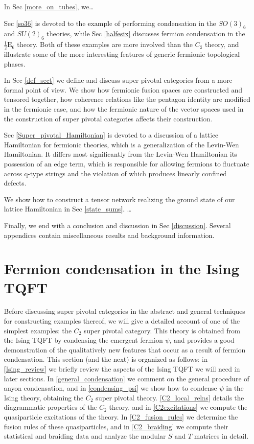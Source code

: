 \documentclass[12pt,a4paper]{article}
\newcommand{\halfesix}{\frac{1}{2}\text{E}_6}
\begin{document}
In Sec \ref{more_on_tubes}, we\dots 


Sec \ref{so36} is devoted to the example of performing condensation in the $SO(3)_6$ 
and $SU(2)_6$ theories, while Sec \ref{halfesix} discusses fermion condensation in the $
\halfesix$ theory. 
Both of these examples are more involved than the $C_2$ theory, 
and illustrate some of the more interesting features of generic fermionic topological phases. 

In Sec \ref{def_sect} we define and discuss super pivotal categories from a more formal point of view. 
We show how fermionic fusion spaces are constructed and tensored together, how 
coherence relations like the pentagon identity are modified in the fermionic case, 
and how the fermionic nature of the vector spaces used in the construction of super 
pivotal categories affects their construction. 

Sec \ref{Super_pivotal_Hamiltonian} is devoted to a discussion of a lattice Hamiltonian for fermionic theories, which is a generalization of the Levin-Wen Hamiltonian. 
It differs most significantly from the Levin-Wen Hamiltonian its possession of an edge term, which 
is responsible for allowing fermions to fluctuate across q-type strings and the violation 
of which produces linearly confined defects. 

We show how to construct a tensor network realizing the ground state of our lattice Hamiltonian 
in Sec \ref{state_sums}. \dots


Finally, we end with a conclusion and discussion in Sec \ref{discussion}. 
Several appendices contain miscellaneous results and background information. 



\section{Fermion condensation in the Ising TQFT}  \label{C2_condense_sect}

Before discussing super pivotal categories in the abstract and general techniques for constructing examples thereof,
we will give a detailed account of one of the simplest examples:
the $C_2$ super pivotal category.
This theory 
is obtained from the Ising TQFT by condensing the emergent fermion $\psi$, and provides a good demonstration of the 
qualitatively new features that occur as a result of fermion condensation. 
This section (and the next) is organized as follows: in \ref{Ising_review} we briefly review the aspects of the 
Ising TQFT we will need in later sections. 
In \ref{general_condensation} we comment on the general procedure of anyon condensation, and in \ref{condensing_psi} 
we show how to condense $\psi$ in the Ising theory, obtaining the $C_2$ super pivotal theory. 
\ref{C2_local_relns} details the diagrammatic properties of the $C_2$ theory, and in \ref{C2excitations} we compute 
the quasiparticle excitations of the theory. 
In \ref{C2_fusion_rules} we determine the fusion rules of these quasiparticles, and in \ref{C2_braiding} we compute 
their statistical and braiding data and analyze the modular $S$ and $T$ matrices in detail. 
\end{document}
